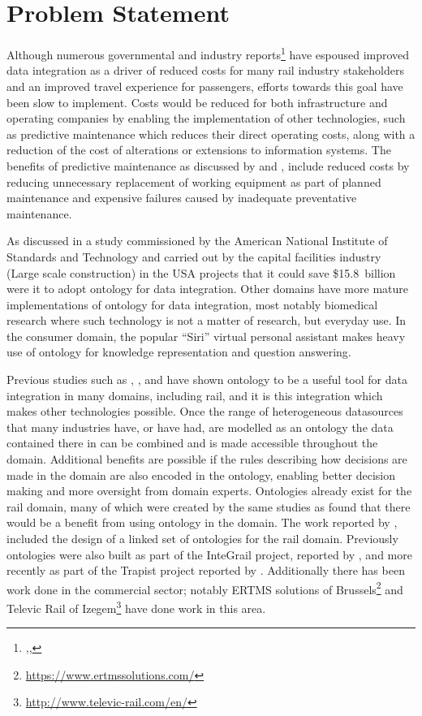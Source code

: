 \chapter{Problem Statement}\label{ch:probstate}
Although numerous governmental and industry reports\footnote{\citep{RDG2017},\citep{DepartmentforTransport2011},\citep{TechnicalStrategyLeadershipGroup2012b}} have espoused improved data integration as a driver of reduced costs for many rail industry stakeholders and an improved travel experience for passengers, efforts towards this goal have been slow to implement. Costs would be reduced for both infrastructure and operating companies by enabling the implementation of other technologies, such as predictive maintenance which reduces their direct operating costs, along with a reduction of the cost of alterations or extensions to information systems. The benefits of predictive maintenance as discussed by \citet{QRE:QRE1634} and \citet{RDG2017}, include reduced costs by reducing unnecessary replacement of working equipment as part of planned maintenance and expensive failures caused by inadequate preventative maintenance. 

As discussed in a study commissioned by the American National Institute of Standards and Technology and carried out by \citep{Gallaher2004} the capital facilities industry (Large scale construction) in the USA projects that it could save \$15.8~billion were it to adopt ontology for data integration. Other domains have more mature implementations of ontology for data integration, most notably biomedical research where such technology is not a matter of research, but everyday use. In the consumer domain, the popular ``Siri'' virtual personal assistant makes heavy use of ontology for knowledge representation and question answering.

Previous studies such as \citep{Verstichel2011a}, \citep{Tutcher2013}, and \citep{Morris} have shown ontology to be a useful tool for data integration in many domains, including rail, and it is this integration which makes other technologies possible. Once the range of heterogeneous datasources that many industries have, or have had, are modelled as an ontology the data contained there in can be combined and is made accessible throughout the domain. Additional benefits are possible if the rules describing how decisions are made in the domain are also encoded in the ontology, enabling better decision making and more oversight from domain experts. Ontologies already exist for the rail domain, many of which were created by the same studies as found that there would be a benefit from using ontology in the domain. The work reported by \citet{Tutcher2015}, included the design of a linked set of ontologies for the rail domain. Previously ontologies were also built as part of the InteGrail project, reported by \citet{Kopf2010}, and more recently as part of the Trapist project reported by \citet{Bhatti2016}. Additionally there has been work done in the commercial sector; notably ERTMS solutions of Brussels\footnote{\url{https://www.ertmssolutions.com/}} and Televic Rail of Izegem\footnote{\url{http://www.televic-rail.com/en/}} have done work in this area.

